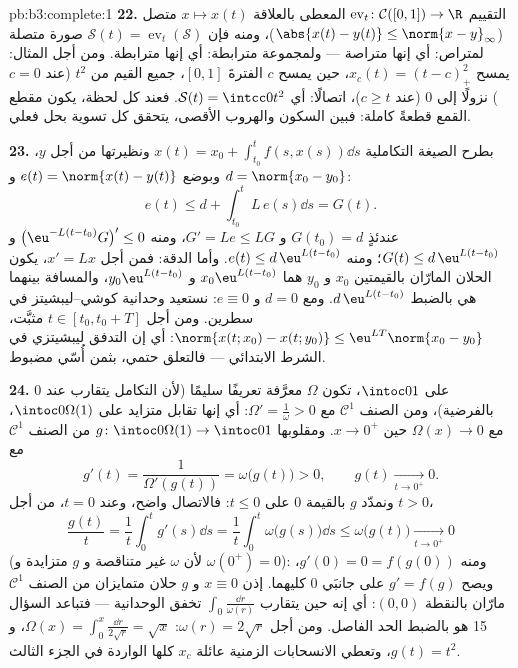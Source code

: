 \begin{solution}{pb:b3:complete:1}
\textbf{22.} التقييم $\operatorname{ev}_t\colon
\mathcal C([0,1]) \to \R$ المعطى بالعلاقة $x \mapsto x(t)$ متصل
($\abs{x(t) - y(t)} \leq \norm{x - y}_\infty$)، ومنه فإن $\mathcal
S(t) = \operatorname{ev}_t(\mathcal S)$ صورة متصلة لمتراص: أي إنها متراصة
--- ولمجموعة مترابطة: أي إنها مترابطة. ومن أجل المثال: يمسح
$x_c(t) = (t - c)_+^2$، حين يمسح $c$ الفترةَ $[0, 1]$، جميع القيم من $t^2$
(عند $c = 0$) نزولًا إلى $0$ (عند $c \geq t$)، اتصالًا: أي
$\mathcal S(t) =
\intcc0{t^2}$. فعند كل لحظة، يكون مقطع القمع قطعةً كاملة: فبين السكون
والهروب الأقصى، يتحقق كل تسوية بحل فعلي.

\textbf{23.} بطرح الصيغة التكاملية $x(t) = x_0 +
\int_{t_0}^tf(s, x(s))\dd s$ ونظيرتها من أجل $y$،
وبوضع $e(t) = \norm{x(t) - y(t)}$ و $d = \norm{x_0 - y_0}$:
\[
e(t) \leq d + \int_{t_0}^tL\,e(s)\dd s = G(t).
\]
عندئذٍ $G(t_0) = d$ و $G' = Le \leq LG$، ومنه $\bigl(\eu^{-L(t
- t_0)}G\bigr)' \leq 0$ و $G(t) \leq d\,\eu^{L(t - t_0)}$؛ ومنه
$e(t) \leq d\,\eu^{L(t-t_0)}$. وأما الدقة: فمن أجل $x' =
Lx$، يكون الحلان المارّان
بالقيمتين $x_0$ و $y_0$ هما $x_0\eu^{L(t -
t_0)}$ و $y_0\eu^{L(t-t_0)}$، والمسافة بينهما
هي بالضبط $d\,\eu^{L(t-t_0)}$. ومع $d = 0$ و $e \equiv 0$: نستعيد وحدانية
كوشي--ليبشيتز في سطرين. ومن أجل $t \in [t_0, t_0 + T]$ مثبَّت، $\norm{x(t; x_0) - x(t;
y_0)} \leq \eu^{LT}\norm{x_0 - y_0}$: أي إن
التدفق ليبشيتزي في الشرط الابتدائي --- فالتعلق حتمي، بثمن أُسّي
مضبوط.

\textbf{24.} على $\intoc01$، تكون $\Omega$ معرَّفة تعريفًا سليمًا
(لأن التكامل يتقارب عند $0$ بالفرضية)، ومن الصنف
$\mathcal C^1$ مع $\Omega' = \frac1\omega > 0$: أي إنها تقابل متزايد على $\intoc0{\Omega(1)}$،
مع $\Omega(x) \to 0$ حين $x \to 0^+$. ومقلوبها $g \colon \intoc0{\Omega(1)} \to \intoc01$ من الصنف
$\mathcal C^1$ مع
\[
g'(t) = \frac1{\Omega'(g(t))} = \omega\bigl(g(t)\bigr) > 0,
\qquad g(t) \xrightarrow[t \to 0^+]{} 0 .
\]
ونمدّد $g$ بالقيمة $0$ على $t \leq 0$: فالاتصال واضح، وعند
$t = 0$، من أجل $t > 0$،
\[
\frac{g(t)}t = \frac1t\int_0^tg'(s)\dd s
= \frac1t\int_0^t\omega\bigl(g(s)\bigr)\dd s
\leq \omega\bigl(g(t)\bigr) \xrightarrow[t\to0^+]{} 0
\]
(لأن $\omega$ غير متناقصة و $g$ متزايدة و $\omega(0^+) = 0$): ومنه
$g'(0) = 0 = f(g(0))$، ويصح $g' = f(g)$ على جانبَي $0$ كليهما. إذن $x \equiv 0$
و $g$ حلان متمايزان من الصنف $\mathcal
C^1$ مارّان بالنقطة $(0, 0)$:
أي إنه حين يتقارب $\int_0\frac{\dd r}
{\omega(r)}$ تخفق الوحدانية --- فتباعد السؤال 15
هو بالضبط الحد الفاصل. ومن أجل $\omega(r) = 2\sqrt
r$: $\Omega(x) = \int_0^x\frac{\dd r}{2\sqrt r} = \sqrt x$، و $g(t) = t^2$،
وتعطي الانسحابات الزمنية عائلة $x_c$ كلها الواردة في الجزء
الثالث.


\end{solution}
